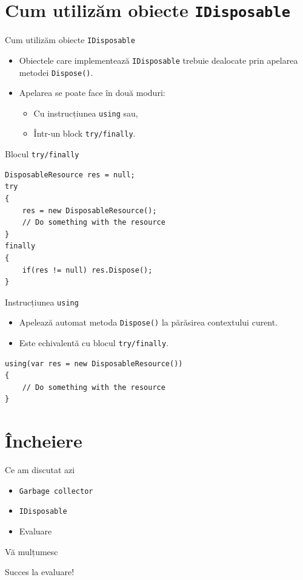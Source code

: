 \documentclass[presentation]{beamer}
\begin{document}
\section{Cum utilizăm obiecte \texttt{IDisposable}}
\label{sec:org4302db1}
\begin{frame}[label={sec:orgbd37a42},fragile]{Cum utilizăm obiecte \texttt{IDisposable}}
 \begin{itemize}
\item Obiectele care implementează \texttt{IDisposable} trebuie dealocate prin apelarea metodei \texttt{Dispose()}.
\item Apelarea se poate face în două moduri:
\begin{itemize}
\item Cu instrucțiunea \texttt{using} sau,
\item Într-un block \texttt{try/finally}.
\end{itemize}
\end{itemize}
\end{frame}
\begin{frame}[label={sec:org510d854},fragile]{Blocul \texttt{try/finally}}
 \begin{verbatim}
DisposableResource res = null;
try
{
    res = new DisposableResource();
    // Do something with the resource
}
finally
{
    if(res != null) res.Dispose();
}
\end{verbatim}
\end{frame}
\begin{frame}[label={sec:orgffe3e28},fragile]{Instrucțiunea \texttt{using}}
 \begin{itemize}
\item Apelează automat metoda \texttt{Dispose()} la părăsirea contextului curent.
\item Este echivalentă cu blocul \texttt{try/finally}.
\end{itemize}
\vskip 0.3in
\begin{verbatim}
using(var res = new DisposableResource())
{
    // Do something with the resource
}
\end{verbatim}
\end{frame}
\section{Încheiere}
\label{sec:org50c6e59}
\begin{frame}[label={sec:org072efbb},fragile]{Ce am discutat azi}
 \begin{itemize}
\item \texttt{Garbage collector}
\item \texttt{IDisposable}
\item Evaluare
\end{itemize}
\end{frame}
\begin{frame}[label={sec:orgd58d2b6}]{Vă mulțumesc}
\begin{center}
Succes la evaluare!
\end{center}
\end{frame}
\end{document}
